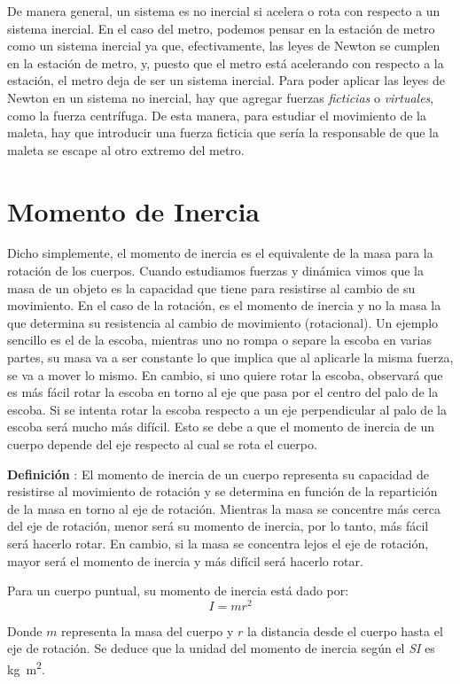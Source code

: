 \documentclass[letterpaper]{article}
\newcounter{definiciones}
\newcommand{\defii}{\stepcounter{definiciones} \textbf{Definición \thedefiniciones}: }
\newenvironment{defi}{\begin{framed} \defii}{\end{framed}}
\begin{document}
De manera general, un sistema es no inercial si acelera o rota con respecto a un sistema inercial. En el caso del metro, podemos pensar en la estación de metro como un sistema inercial ya que, efectivamente, las leyes de Newton se cumplen en la estación de metro, y, puesto que el metro está acelerando con respecto a la estación, el metro deja de ser un sistema inercial. Para poder aplicar las leyes de Newton en un sistema no inercial, hay que agregar fuerzas \emph{ficticias} o \emph{virtuales}, como la fuerza centrífuga. De esta manera, para estudiar el movimiento de la maleta, hay que introducir una fuerza ficticia que sería la responsable de que la maleta se escape al otro extremo del metro.                   

\section*{Momento de Inercia}

Dicho simplemente, el momento de inercia es el equivalente de la masa para la rotación de los cuerpos. Cuando estudiamos fuerzas y dinámica vimos que la masa de un objeto es la capacidad que tiene para resistirse al cambio de su movimiento. En el caso de la rotación, es el momento de inercia y no la masa la que determina su resistencia al cambio de movimiento (rotacional). Un ejemplo sencillo es el de la escoba, mientras uno no rompa o separe la escoba en varias partes, su masa va a ser constante lo que implica que al aplicarle la misma fuerza, se va a mover lo mismo. En cambio, si uno quiere rotar la escoba, observará que es más fácil rotar la escoba en torno al eje que pasa por el centro del palo de la escoba. Si se intenta rotar la escoba respecto a un eje perpendicular al palo de la escoba será mucho más difícil. Esto se debe a que el momento de inercia de un cuerpo depende del eje respecto al cual se rota el cuerpo.

\begin{defi}
El momento de inercia de un cuerpo representa su capacidad de resistirse al movimiento de rotación y se determina en función de la repartición de la masa en torno al eje de rotación. Mientras la masa se concentre más cerca del eje de rotación, menor será su momento de inercia, por lo tanto, más fácil será hacerlo rotar. En cambio, si la masa se concentra lejos el eje de rotación, mayor será el momento de inercia y más difícil será hacerlo rotar.

Para un cuerpo puntual, su momento de inercia está dado por:
$$I = mr^2$$

Donde $m$ representa la masa del cuerpo y $r$ la distancia desde el cuerpo hasta el eje de rotación. Se deduce que la unidad del momento de inercia según el \emph{SI} es \si{kg.m^2}.
\end{defi}
\end{document}
